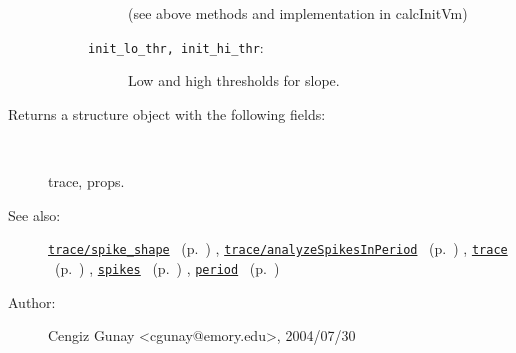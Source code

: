 \begin{description}
\begin{description}
\begin{description}
(see above methods and implementation in calcInitVm)\item[\texttt{init\_lo\_thr, init\_hi\_thr}:]
 Low and high thresholds for slope.
\end{description}%
\end{description}%
%
\item[Returns a structure object with the following fields:]~

	trace, props.
%
%
\item[See also:]%
\hyperlink{ref_trace__spike_shape}{\texttt{trace/spike\_shape}}%
\ (p.~\pageref{ref_trace__spike_shape})%
%
, \hyperlink{ref_trace__analyzeSpikesInPeriod}{\texttt{trace/analyzeSpikesInPeriod}}%
\ (p.~\pageref{ref_trace__analyzeSpikesInPeriod})%
%
, \hyperlink{ref_trace}{\texttt{trace}}%
\ (p.~\pageref{ref_trace})%
%
, \hyperlink{ref_spikes}{\texttt{spikes}}%
\ (p.~\pageref{ref_spikes})%
%
, \hyperlink{ref_period}{\texttt{period}}%
\ (p.~\pageref{ref_period})%
%
%
\item[Author:]%
Cengiz Gunay <cgunay@emory.edu>, 2004/07/30%
\end{description}
\methodline%
